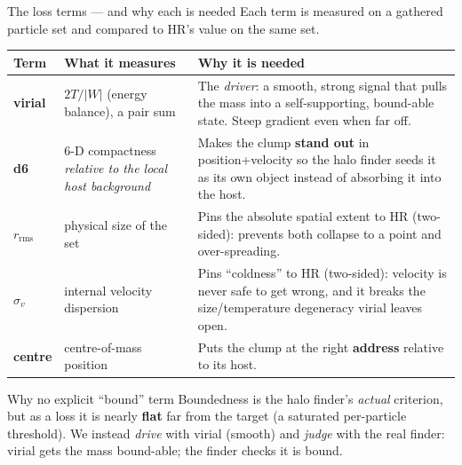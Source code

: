 \documentclass[aspectratio=169]{beamer}
\begin{document}
\begin{frame}{The loss terms --- and why each is needed}
\scriptsize
Each term is measured on a gathered particle set and compared to HR's value on
the same set.
\vspace{0.15cm}

\centering
\begin{tabular}{p{} p{} p{}}
\hline
Term & What it measures & Why it is needed \\
\hline
\textbf{virial} & $2T/|W|$ (energy balance), a pair sum &
  The \emph{driver}: a smooth, strong signal that pulls the mass into a
  self-supporting, bound-able state. Steep gradient even when far off. \\
\hline
\textbf{d6} & 6-D compactness \emph{relative to the local host background} &
  Makes the clump \textbf{stand out} in position+velocity so the halo finder
  seeds it as its own object instead of absorbing it into the host. \\
\hline
\textbf{$r_{\mathrm{rms}}$} & physical size of the set &
  Pins the absolute spatial extent to HR (two-sided): prevents both collapse
  to a point and over-spreading. \\
\hline
\textbf{$\sigma_v$} & internal velocity dispersion &
  Pins ``coldness'' to HR (two-sided): velocity is never safe to get wrong, and
  it breaks the size/temperature degeneracy virial leaves open. \\
\hline
\textbf{centre} & centre-of-mass position &
  Puts the clump at the right \textbf{address} relative to its host. \\
\hline
\end{tabular}

\vspace{0.25cm}
\begin{block}{Why no explicit ``bound'' term}
Boundedness is the halo finder's \emph{actual} criterion, but as a loss it is
nearly \textbf{flat} far from the target (a saturated per-particle threshold).
We instead \emph{drive} with virial (smooth) and \emph{judge} with the real
finder: virial gets the mass bound-able; the finder checks it is bound.
\end{block}
\end{frame}

\end{document}
